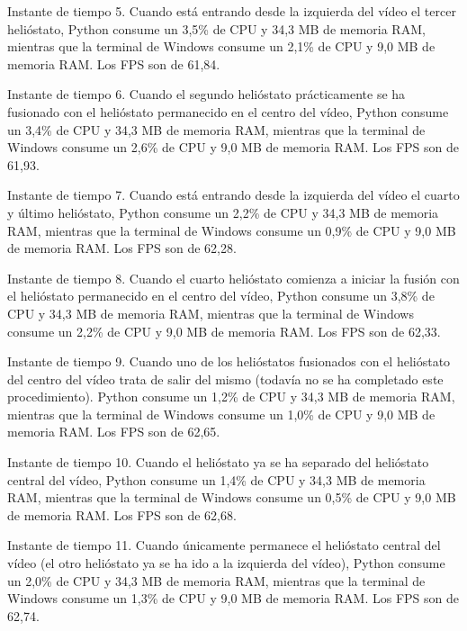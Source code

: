 \documentclass[12pt]{article}
\begin{document}
Instante de tiempo 5. Cuando está entrando desde la izquierda del vídeo el tercer helióstato, Python consume un 3,5\% de CPU y 34,3 MB de memoria RAM, mientras que la terminal de Windows consume un 2,1\% de CPU y 9,0 MB de memoria RAM. Los FPS son de 61,84.




Instante de tiempo 6. Cuando el segundo helióstato prácticamente se ha fusionado con el helióstato permanecido en el centro del vídeo, Python consume un 3,4\% de CPU y 34,3 MB de memoria RAM, mientras que la terminal de Windows consume un 2,6\% de CPU y 9,0 MB de memoria RAM. Los FPS son de 61,93.




Instante de tiempo 7. Cuando está entrando desde la izquierda del vídeo el cuarto y último helióstato, Python consume un 2,2\% de CPU y 34,3 MB de memoria RAM, mientras que la terminal de Windows consume un 0,9\% de CPU y 9,0 MB de memoria RAM. Los FPS son de 62,28.




Instante de tiempo 8. Cuando el cuarto helióstato comienza a iniciar la fusión con el helióstato permanecido en el centro del vídeo, Python consume un 3,8\% de CPU y 34,3 MB de memoria RAM, mientras que la terminal de Windows consume un 2,2\% de CPU y 9,0 MB de memoria RAM. Los FPS son de 62,33.




Instante de tiempo 9. Cuando uno de los helióstatos fusionados con el helióstato del centro del vídeo trata de salir del mismo (todavía no se ha completado este procedimiento). Python consume un 1,2\% de CPU y 34,3 MB de memoria RAM, mientras que la terminal de Windows consume un 1,0\% de CPU y 9,0 MB de memoria RAM. Los FPS son de 62,65.




Instante de tiempo 10. Cuando el helióstato ya se ha separado del helióstato central del vídeo, Python consume un 1,4\% de CPU y 34,3 MB de memoria RAM, mientras que la terminal de Windows consume un 0,5\% de CPU y 9,0 MB de memoria RAM. Los FPS son de 62,68.




Instante de tiempo 11. Cuando únicamente permanece el helióstato central del vídeo (el otro helióstato ya se ha ido a la izquierda del vídeo), Python consume un 2,0\% de CPU y 34,3 MB de memoria RAM, mientras que la terminal de Windows consume un 1,3\% de CPU y 9,0 MB de memoria RAM. Los FPS son de 62,74.
\end{document}
